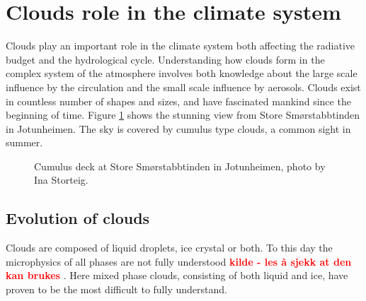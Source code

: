 \section{Clouds role in the climate system} \label{sec:cloud_in_climate_system}
Clouds play an important role in the climate system both affecting the radiative budget and the hydrological cycle. Understanding how clouds form in the complex system of the atmosphere involves both knowledge about the large scale influence by the circulation and the small scale influence by aerosols. Clouds exist in countless number of shapes and sizes, and have fascinated mankind since the beginning of time. Figure \ref{fig:cloud_cover_jotunheimen} shows the stunning view from Store Smørstabbtinden in Jotunheimen. The sky is covered by cumulus type clouds, a common sight in summer.
\begin{figure}
    \centering
    \caption[Cumulus deck at Store Smørstabbtinden in Jotunheimen]{Cumulus deck at Store Smørstabbtinden in Jotunheimen, photo by Ina Storteig.}
    \label{fig:cloud_cover_jotunheimen}
\end{figure}

\subsection{Evolution of clouds}
Clouds are composed of liquid droplets, ice crystal or both. To this day the microphysics of all phases are not fully understood \textcolor{red}{\textbf{kilde - les å sjekk at den kan brukes} \cite{ReviewMicroPhys}}. Here mixed phase clouds, consisting of both liquid and ice, have proven to be the most difficult to fully understand. 

